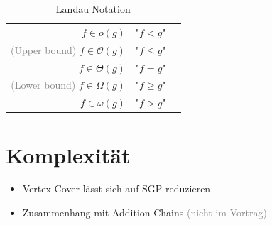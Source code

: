 \documentclass[xcolor=dvipsnames]{beamer}
\begin{document}
\begin{frame}{\FrameName}
\begin{table}
	\caption{Landau Notation}
	\begin{tabular}{ r p{3.5cm} l}
		
		$f \in o(g)$ & "$f < g$" \\
		\textcolor{gray}{(Upper bound)} $f \in \mathcal{O}(g)$ & "$f\leq g$" \\
		$f \in \Theta(g)$ & "$f = g$"\\
		\textcolor{gray}{(Lower bound)} $f \in \Omega(g)$ & "$f \geq g$"\\
		$f \in \omega(g)$ & "$f > g$"\\
	\end{tabular}
\end{table}
\end{frame}

\section{Komplexität}
	
\begin{frame}{\FrameName}
\begin{itemize}[<+->]
	\item Vertex Cover lässt sich auf SGP reduzieren
	\item Zusammenhang mit Addition Chains \textcolor{gray}{(nicht im Vortrag)}
\end{itemize}
\end{frame}
\end{document}
